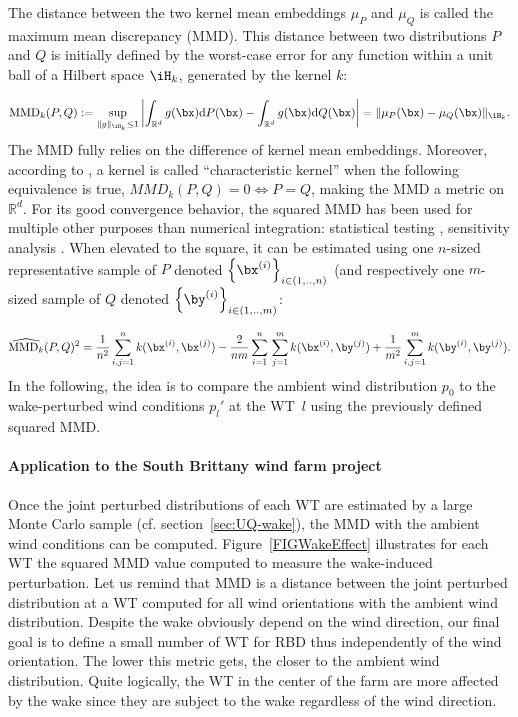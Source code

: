 The distance between the two kernel mean embeddings $\mu_P$  and $\mu_Q$ is called the maximum mean discrepancy (MMD). 
This distance between two distributions $P$ and $Q$ is initially defined by the worst-case error for any function within a unit ball of a Hilbert space $\iH_k$, generated by the kernel $k$:

\begin{equation}
\mathrm{MMD}_k(P,Q):=\underset{\| g \|_{\iH_k} \leq 1}{\mathrm{sup}} 
\left\lvert \int_{\mathbb{R}^d}{g(\bx) \mathrm{d}P(\bx)}
- \int_{\mathbb{R}^d}{g(\bx) \mathrm{d}Q(\bx)} \right\rvert
= \|\mu_P(\bx) - \mu_Q(\bx) \| _ {\iH_k}.
\end{equation}
The MMD fully relies on the difference of kernel mean embeddings. 
Moreover, according to \cite{sriperumbudur_2010}, a kernel is called “characteristic kernel” when the following equivalence is true, $MMD_k (P,Q)=0 \iff P=Q$, making the MMD a metric on $\mathbb{R}^d$. 
For its good convergence behavior, the squared MMD has been used for multiple other purposes than numerical integration: statistical testing \cite{gretton_2006}, sensitivity analysis \cite{daveiga_2015}. 
When elevated to the square, it can be estimated using one $n$-sized representative sample of $P$ denoted $\left\{ \bx^{(i)} \right\}_{i \in (1,..,n)}$
(and respectively one $m$-sized sample of $Q$ denoted $\left\{ \by^{(i)} \right\} _{i \in (1,..,m)}$:

\begin{equation}
\widehat{\mathrm{MMD}_k}(P,Q) ^ 2 = \frac{1}{n^2} 
\sum_{i,j=1}^{n}{k(\bx^{(i)}, \bx^{(j)})} - \frac{2}{n m} \sum_{i=1}^{n}{ } \sum_{j=1}^{m}{k(\bx^{(i)},\by^{(j)})} + \frac{1}{m^2}  \sum_{i,j=1}^{m}{k(\by^{(i)},\by^{(j)})}.
\end{equation}
In the following, the idea is to compare the ambient wind distribution $p_0$ to the wake-perturbed wind conditions $p_l'$ at the WT~$l$ using the previously defined squared MMD.

\paragraph{Application to the South Brittany wind farm project}
\label{SecApplicationSB}
Once the joint perturbed distributions of each WT are estimated by a large Monte Carlo sample (cf. section~\ref{sec:UQ-wake}), the MMD with the ambient wind conditions can be computed. 
Figure~\ref{FIGWakeEffect} illustrates for each WT the squared MMD value computed to measure the wake-induced perturbation. 
Let us remind that MMD is a distance between the joint perturbed distribution at a WT computed for all wind orientations with the ambient wind distribution. 
Despite the wake obviously depend on the wind direction, our final goal is to define a small number of WT for RBD thus independently of the wind orientation. 
The lower this metric gets, the closer to the ambient wind distribution. 
Quite logically, the WT in the center of the farm are more affected by the wake since they are subject to the wake regardless of the wind direction.

